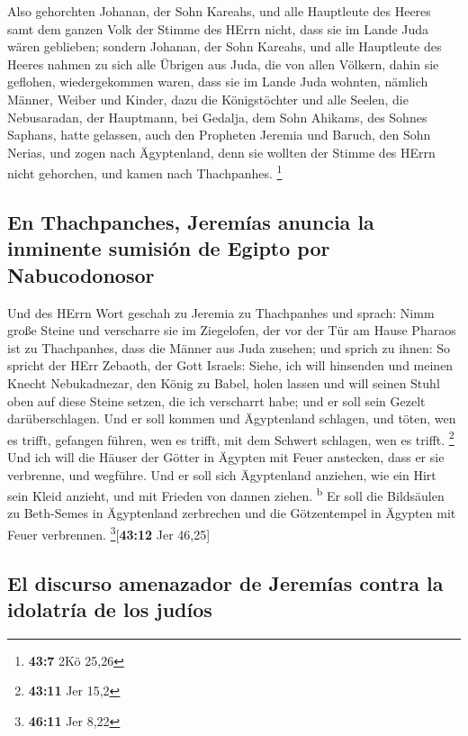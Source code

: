  Also gehorchten Johanan, der Sohn Kareahs, und alle
Hauptleute des Heeres samt dem ganzen Volk der Stimme des HErrn nicht,
dass sie im Lande Juda wären geblieben;  sondern Johanan,
der Sohn Kareahs, und alle Hauptleute des Heeres nahmen zu sich alle
Übrigen aus Juda, die von allen Völkern, dahin sie geflohen,
wiedergekommen waren, dass sie im Lande Juda wohnten, 
nämlich Männer, Weiber und Kinder, dazu die Königstöchter und alle
Seelen, die Nebusaradan, der Hauptmann, bei Gedalja, dem Sohn Ahikams,
des Sohnes Saphans, hatte gelassen, auch den Propheten Jeremia und
Baruch, den Sohn Nerias,  und zogen nach Ägyptenland, denn
sie wollten der Stimme des HErrn nicht gehorchen, und kamen nach
Thachpanhes. \footnote{\textbf{43:7} 2Kö 25,26}

\hypertarget{en-thachpanches-jeremuxedas-anuncia-la-inminente-sumisiuxf3n-de-egipto-por-nabucodonosor}{%
\subsection{En Thachpanches, Jeremías anuncia la inminente sumisión de
Egipto por
Nabucodonosor}\label{en-thachpanches-jeremuxedas-anuncia-la-inminente-sumisiuxf3n-de-egipto-por-nabucodonosor}}

 Und des HErrn Wort geschah zu Jeremia zu Thachpanhes und
sprach:  Nimm große Steine und verscharre sie im
Ziegelofen, der vor der Tür am Hause Pharaos ist zu Thachpanhes, dass
die Männer aus Juda zusehen;  und sprich zu ihnen: So
spricht der HErr Zebaoth, der Gott Israels: Siehe, ich will hinsenden
und meinen Knecht Nebukadnezar, den König zu Babel, holen lassen und
will seinen Stuhl oben auf diese Steine setzen, die ich verscharrt habe;
und er soll sein Gezelt darüberschlagen.  Und er soll
kommen und Ägyptenland schlagen, und töten, wen es trifft, gefangen
führen, wen es trifft, mit dem Schwert schlagen, wen es trifft.
\footnote{\textbf{43:11} Jer 15,2}  Und ich will die
Häuser der Götter in Ägypten mit Feuer anstecken, dass er sie verbrenne,
und wegführe. Und er soll sich Ägyptenland anziehen, wie ein Hirt sein
Kleid anzieht, und mit Frieden von dannen ziehen. \textsuperscript{b}
 Er soll die Bildsäulen zu Beth-Semes in Ägyptenland
zerbrechen und die Götzentempel in Ägypten mit Feuer verbrennen.
\footnote{\textbf{46:11} Jer 8,22}{[}\textbf{43:12} Jer 46,25{]}

\hypertarget{el-discurso-amenazador-de-jeremuxedas-contra-la-idolatruxeda-de-los-juduxedos}{%
\subsection{El discurso amenazador de Jeremías contra la idolatría de
los
judíos}\label{el-discurso-amenazador-de-jeremuxedas-contra-la-idolatruxeda-de-los-juduxedos}}

